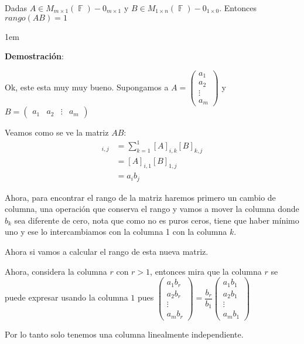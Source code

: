 \documentclass[12pt, fleqn]{article}                             %
\newenvironment{SmallIndentation}[1][0.75em]                    %
        {\begin{adjustwidth}{#1}{}\begin{footnotesize}}             %
        {\end{footnotesize}\end{adjustwidth}}                       %
\theoremstyle{break}                                            %
\DeclareMathOperator \GenericField {\mathbb{F}}                 %
\newcommand{\pVector}[1]                                        %
        { \ensuremath{\begin{pmatrix}#1\end{pmatrix}} }             %
\begin{document}
    Dadas $A \in M_{m \times 1}(\GenericField) - 0_{m \times 1}$ y $B \in M_{1 \times n}(\GenericField) - 0_{1 \times 0}$.
    Entonces $rango(AB) = 1$

    \begin{SmallIndentation}[1em]
        \textbf{Demostración}:
        
        Ok, este esta muy muy bueno.
        Supongamos a $A = \pVector{a_1 \\ a_2 \\ \vdots \\ a_m}$ y $B = \pVector{a_1 & a_2 & \vdots & a_m}$

        Veamos como se ve la matriz $AB$:
        \begin{align*}
            [AB]_{i, j}
                &= \sum_{k = 1}^1 [A]_{i, k} [B]_{k, j}         \\
                &= [A]_{i, 1} [B]_{1, j}                        \\
                &= a_i b_j                                      
        \end{align*}

        Ahora, para encontrar el rango de la matriz haremos primero un cambio de columna, una operación que conserva el rango
        y vamos a mover la columna donde $b_k$ sea diferente de cero, nota que como no es puros ceros, tiene que haber mínimo uno
        y ese lo intercambiamos con la columna 1 con la columna $k$.

        Ahora si vamos a calcular el rango de esta nueva matriz.

        Ahora, considera la columna $r$ con $r > 1$, entonces mira que la columna $r$ se puede expresar usando la columna $1$
        pues $\pVector{a_1 b_r \\ a_2 b_r \\ \vdots \\ a_m b_r} = \dfrac{b_r}{b_1} \pVector{a_1 b_1 \\ a_2 b_1 \\ \vdots \\ a_m b_1}$

        Por lo tanto solo tenemos una columna linealmente independiente.
    
    \end{SmallIndentation}
        



\clearpage
\end{document}
